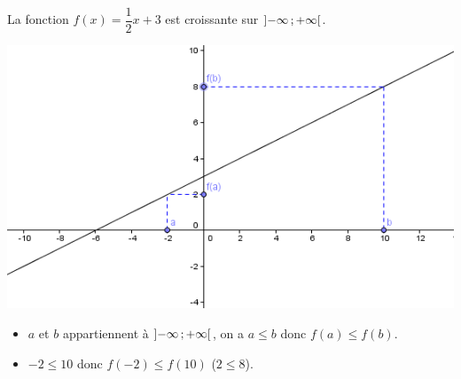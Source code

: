 \begin{myex}
		La fonction $f(x) = \dfrac{1}{2}x + 3$ est croissante sur $\mbox{\ensuremath{\left]- \infty \mathpunct{};+ \infty\right[}}$.
		\begin{center}
			\includegraphics[scale=0.65]{./img/croiss}
		\end{center}
		
		\begin{itemize}
			\item $a$ et $b$ appartiennent à $\mbox{\ensuremath{\left]- \infty \mathpunct{};+ \infty\right[}}$, on a $a \leq b$ donc $f(a) \leq f(b)$.
			\item $-2 \leq 10$ donc $f(-2) \leq f(10)$ ($2 \leq 8$).
		\end{itemize}
		
\end{myex}
